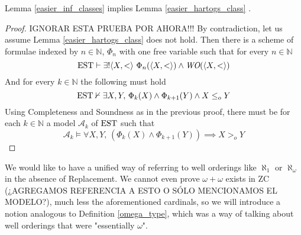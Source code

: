 \begin{theorem}
	Lemma \ref{easier_inf_classes} implies Lemma \ref{easier_hartogs_class} .
\end{theorem}
\begin{proof}
	IGNORAR ESTA PRUEBA POR AHORA!!!
	By contradiction, let us assume Lemma \ref{easier_hartogs_class} does not hold. Then there is a scheme of formulae indexed by $n\in\mathbb{N}$, $\Phi_n$ with one free variable such that for every $n\in\mathbb{N}$
	\[
		\operatorname{EST} \vdash \exists! \langle X, < \rangle \ \Phi_n ( \langle X,<\rangle) \land 
		\emph{WO}(\langle X, < \rangle)
	\]
	And for every $k\in\mathbb{N}$ the following must hold
	\[			
		\operatorname{EST} \nvdash \exists X,Y, \, \Phi_k (X) \land \Phi_{k+1} (Y) \land X \leq_o Y
	\]	
	Using Completeness and Soundness as in the previous proof, there must be for each $k\in\mathbb{N}$ a model $\mathcal{A}_k$ of $\operatorname{EST}$ such that
	\[
		\mathcal{A}_k \vDash \forall X,Y, \, (\Phi_k (X) \land \Phi_{k+1} (Y)) \implies X >_o Y
	\]	
\end{proof}

We would like to have a unified way of referring to well orderings like $\aleph_1$ or $\aleph_\omega$ in the absence of Replacement. We cannot even prove $\omega+\omega$ exists in ZC (¿AGREGAMOS REFERENCIA A ESTO O SÓLO MENCIONAMOS EL MODELO?), much less the aforementioned cardinals, so we will introduce a notion analogous to Definition \ref{omega_type}, which was a way of talking about well orderings that were "essentially $\omega$".

